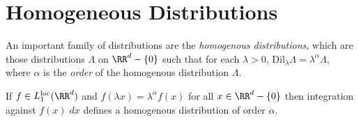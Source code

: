 
\section{Homogeneous Distributions}

An important family of distributions are the \emph{homogenous distributions}, which are those distributions $\Lambda$ on $\RR^d - \{ 0 \}$ such that for each $\lambda > 0$, $\text{Dil}_\lambda \Lambda = \lambda^\alpha \Lambda$, where $\alpha$ is the \emph{order} of the homogenous distribution $\Lambda$.

\begin{example}
  If $f \in L_1^{\text{loc}}(\RR^d)$ and $f(\lambda x) = \lambda^\alpha f(x)$ for all $x \in \RR^d - \{ 0 \}$ then integration against $f(x)\; dx$ defines a homogenous distribution of order $\alpha$.
\end{example}

